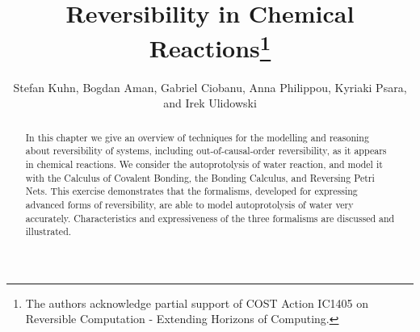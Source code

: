 \documentclass[runningheads]{llncs}
\begin{document}
%
\title{Reversibility in Chemical Reactions\thanks{The authors acknowledge partial support 
of COST Action IC1405 on Reversible Computation - Extending Horizons of Computing.}}
%
%
\author{Stefan Kuhn, Bogdan Aman, Gabriel Ciobanu,  Anna Philippou, Kyriaki Psara, and 
Irek Ulidowski}
%
%
%
\maketitle              %
%
\begin{abstract}
In this chapter we give an overview of techniques for the modelling and reasoning 
about reversibility of systems, including out-of-causal-order reversibility, as it 
appears in chemical reactions. We consider the autoprotolysis of water reaction, and model it with the Calculus 
of Covalent Bonding, the Bonding Calculus, and Reversing Petri Nets.
This exercise demonstrates that the formalisms, developed for expressing advanced forms of 
reversibility, are able to model autoprotolysis of water very accurately. Characteristics and 
expressiveness of the three formalisms are discussed and illustrated.

\end{abstract}
%
%
%
\end{document}
